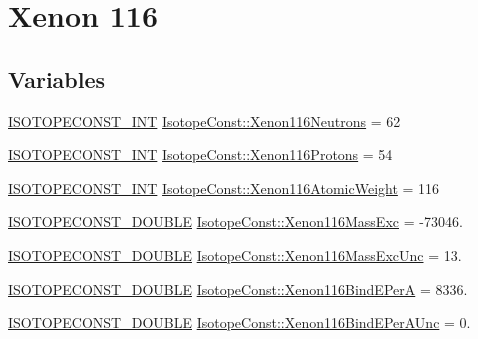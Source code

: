 \hypertarget{group___isotope_const-_xenon-_xe116}{}\section{Xenon 116}
\label{group___isotope_const-_xenon-_xe116}
\subsection*{Variables}
\begin{DoxyCompactItemize}
\item 
\mbox{\hyperlink{group___isotope_const-_macros_ga5f18360b3e99483a35c32d789e62621c}{I\+S\+O\+T\+O\+P\+E\+C\+O\+N\+S\+T\+\_\+\+I\+NT}} \mbox{\hyperlink{group___isotope_const-_xenon-_xe116_ga47bf9418be111dbcdae58839ea155609}{Isotope\+Const\+::\+Xenon116\+Neutrons}} = 62
\item 
\mbox{\hyperlink{group___isotope_const-_macros_ga5f18360b3e99483a35c32d789e62621c}{I\+S\+O\+T\+O\+P\+E\+C\+O\+N\+S\+T\+\_\+\+I\+NT}} \mbox{\hyperlink{group___isotope_const-_xenon-_xe116_gab73843a7142de60b76dc067efd469072}{Isotope\+Const\+::\+Xenon116\+Protons}} = 54
\item 
\mbox{\hyperlink{group___isotope_const-_macros_ga5f18360b3e99483a35c32d789e62621c}{I\+S\+O\+T\+O\+P\+E\+C\+O\+N\+S\+T\+\_\+\+I\+NT}} \mbox{\hyperlink{group___isotope_const-_xenon-_xe116_gab4c5485d08eb8955ff1ba14953ae84a6}{Isotope\+Const\+::\+Xenon116\+Atomic\+Weight}} = 116
\item 
\mbox{\hyperlink{group___isotope_const-_macros_ga8f45a7272ce02c0b4c65c44636ed719a}{I\+S\+O\+T\+O\+P\+E\+C\+O\+N\+S\+T\+\_\+\+D\+O\+U\+B\+LE}} \mbox{\hyperlink{group___isotope_const-_xenon-_xe116_gafb6a31a73d1870954546b646f1a83637}{Isotope\+Const\+::\+Xenon116\+Mass\+Exc}} = -\/73046.
\item 
\mbox{\hyperlink{group___isotope_const-_macros_ga8f45a7272ce02c0b4c65c44636ed719a}{I\+S\+O\+T\+O\+P\+E\+C\+O\+N\+S\+T\+\_\+\+D\+O\+U\+B\+LE}} \mbox{\hyperlink{group___isotope_const-_xenon-_xe116_gaf8fb20f186f8b944c6c120235861f317}{Isotope\+Const\+::\+Xenon116\+Mass\+Exc\+Unc}} = 13.
\item 
\mbox{\hyperlink{group___isotope_const-_macros_ga8f45a7272ce02c0b4c65c44636ed719a}{I\+S\+O\+T\+O\+P\+E\+C\+O\+N\+S\+T\+\_\+\+D\+O\+U\+B\+LE}} \mbox{\hyperlink{group___isotope_const-_xenon-_xe116_gaf289a0be7e99664c83759121f6842895}{Isotope\+Const\+::\+Xenon116\+Bind\+E\+PerA}} = 8336.
\item 
\mbox{\hyperlink{group___isotope_const-_macros_ga8f45a7272ce02c0b4c65c44636ed719a}{I\+S\+O\+T\+O\+P\+E\+C\+O\+N\+S\+T\+\_\+\+D\+O\+U\+B\+LE}} \mbox{\hyperlink{group___isotope_const-_xenon-_xe116_ga26180eff1716c9e5cc94e70ee0c9148d}{Isotope\+Const\+::\+Xenon116\+Bind\+E\+Per\+A\+Unc}} = 0.

\end{DoxyCompactItemize}
